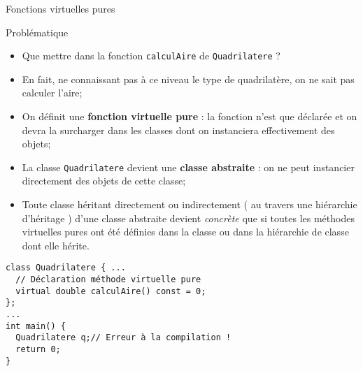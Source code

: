 \documentclass[compress,10pt,aspectratio=169]{beamer}
\begin{document}
\begin{frame}[fragile]{Fonctions virtuelles pures}
  \scriptsize\vspace*{-4mm}
\begin{block}{\small Problématique}
\begin{itemize}
  \item Que mettre dans la fonction \texttt{calculAire} de \texttt{Quadrilatere} ?
  \item En fait, ne connaissant pas à ce niveau le type de quadrilatère, on ne sait pas calculer l'aire;
  \item On définit une \textbf{fonction virtuelle pure} : la fonction n'est que déclarée et on devra la surcharger dans les classes dont on instanciera effectivement des objets;
  \item La classe \texttt{Quadrilatere} devient une \textbf{classe abstraite} :
  on ne peut instancier directement des objets de cette classe;
  \item Toute classe héritant directement ou indirectement ( au travers une hiérarchie d'héritage ) d'une classe abstraite devient \textsl{concrète} que si toutes les méthodes virtuelles pures ont été définies dans la classe ou dans la hiérarchie de classe dont elle hérite.
  \end{itemize}
  \end{block}
\begin{verbatim}
class Quadrilatere { ...
  // Déclaration méthode virtuelle pure
  virtual double calculAire() const = 0;
};
...
int main() {
  Quadrilatere q;// Erreur à la compilation !
  return 0;
}
\end{verbatim}
\end{frame}
  
\end{document}
